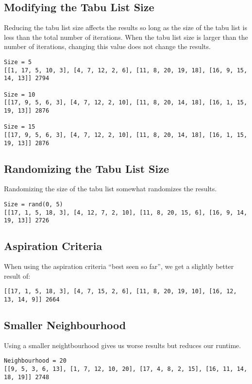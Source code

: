 \documentclass[12pt]{article}
\begin{document}
\subsection*{Modifying the Tabu List Size}
Reducing the tabu list size affects the results so long as the size of the tabu list is less than the total number of iterations. When the tabu list size is larger than the number of iterations, changing this value does not change the results.
\begin{lstlisting}[breaklines=true]
Size = 5
[[1, 17, 5, 10, 3], [4, 7, 12, 2, 6], [11, 8, 20, 19, 18], [16, 9, 15, 14, 13]] 2794

Size = 10
[[17, 9, 5, 6, 3], [4, 7, 12, 2, 10], [11, 8, 20, 14, 18], [16, 1, 15, 19, 13]] 2876

Size = 15
[[17, 9, 5, 6, 3], [4, 7, 12, 2, 10], [11, 8, 20, 14, 18], [16, 1, 15, 19, 13]] 2876
\end{lstlisting}

\subsection*{Randomizing the Tabu List Size}
Randomizing the size of the tabu list somewhat randomizes the results.
\begin{lstlisting}[breaklines=true]
Size = rand(0, 5)
[[17, 1, 5, 18, 3], [4, 12, 7, 2, 10], [11, 8, 20, 15, 6], [16, 9, 14, 19, 13]] 2726
\end{lstlisting}

\subsection*{Aspiration Criteria}
When using the aspiration criteria ``best seen so far'', we get a slightly better result of:
\begin{lstlisting}[breaklines=true]
[[17, 1, 5, 18, 3], [4, 7, 15, 2, 6], [11, 8, 20, 19, 10], [16, 12, 13, 14, 9]] 2664
\end{lstlisting}

\subsection*{Smaller Neighbourhood}
Using a smaller neightbourhood gives us worse results but reduces our runtime.
\begin{lstlisting}[breaklines=true]
Neighbourhood = 20
[[9, 5, 3, 6, 13], [1, 7, 12, 10, 20], [17, 4, 8, 2, 15], [16, 11, 14, 18, 19]] 2748
\end{lstlisting}
\end{document}
